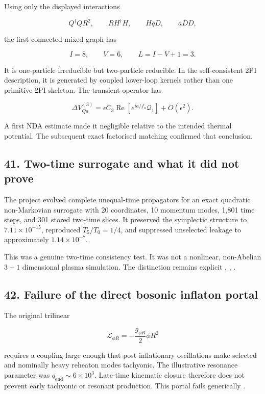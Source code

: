 \documentclass[
]{article}
\begin{document}
Using only the displayed interactions

\[
Q^\dagger QR^2,
\qquad
RH^\dagger H,
\qquad
H\bar qD,
\qquad
a\bar DD,
\]

the first connected mixed graph has

\[
I=8,
\qquad
V=6,
\qquad
L=I-V+1=3.
\]

It is one-particle irreducible but two-particle reducible. In the
self-consistent 2PI description, it is generated by coupled lower-loop
kernels rather than one primitive 2PI skeleton. The transient operator
has

\[
\Delta V_{Qa}^{(3)}
=\epsilon C_3
\operatorname{Re}[e^{ia/f_a}\mathcal Q_1]
+O(\epsilon^2).
\]

A first NDA estimate made it negligible relative to the intended thermal
potential. The subsequent exact factorised matching confirmed that
conclusion.

\subsection{41. Two-time surrogate and what it did not
prove}\label{two-time-surrogate-and-what-it-did-not-prove}

The project evolved complete unequal-time propagators for an exact
quadratic non-Markovian surrogate with 20 coordinates, 10 momentum
modes, 1,801 time steps, and 301 stored two-time slices. It preserved
the symplectic structure to \(7.11\times10^{-15}\), reproduced
\(T_5/T_0=1/4\), and suppressed unselected leakage to approximately
\(1.14\times10^{-7}\).

This was a genuine two-time consistency test. It was not a nonlinear,
non-Abelian \(3+1\) dimensional plasma simulation. The distinction
remains explicit ,
,
.

\subsection{42. Failure of the direct bosonic inflaton
portal}\label{failure-of-the-direct-bosonic-inflaton-portal}

The original trilinear

\[
\mathcal L_{\phi R}
=-\frac{g_{\phi R}}2\phi R^2
\]

requires a coupling large enough that post-inflationary oscillations
make selected and nominally heavy reheaton modes tachyonic. The
illustrative resonance parameter was
\(q_{\mathrm{end}}\sim6\times10^3\). Late-time kinematic closure
therefore does not prevent early tachyonic or resonant production. This
portal fails generically .
\end{document}
